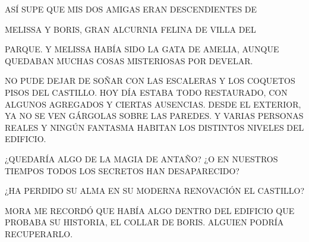 \newpage
{}
ASÍ SUPE QUE MIS DOS AMIGAS ERAN DESCENDIENTES DE 

MELISSA Y BORIS, GRAN ALCURNIA FELINA DE VILLA DEL

 PARQUE. Y MELISSA HABÍA SIDO LA GATA DE AMELIA, AUNQUE QUEDABAN MUCHAS COSAS MISTERIOSAS POR DEVELAR.
 
 NO PUDE DEJAR DE SOÑAR CON LAS ESCALERAS Y LOS COQUETOS PISOS DEL CASTILLO. HOY DÍA ESTABA TODO RESTAURADO, CON ALGUNOS AGREGADOS Y CIERTAS AUSENCIAS. DESDE EL EXTERIOR, YA NO SE VEN GÁRGOLAS SOBRE LAS PAREDES. Y VARIAS PERSONAS REALES Y NINGÚN FANTASMA HABITAN LOS DISTINTOS NIVELES DEL EDIFICIO.
 
 ¿QUEDARÍA ALGO DE LA MAGIA DE ANTAÑO? ¿O EN NUESTROS TIEMPOS TODOS LOS SECRETOS HAN DESAPARECIDO?
 
 ¿HA PERDIDO SU ALMA EN SU MODERNA RENOVACIÓN EL CASTILLO?
 
 MORA ME RECORDÓ QUE HABÍA ALGO DENTRO DEL EDIFICIO QUE PROBABA SU HISTORIA, EL COLLAR DE BORIS. ALGUIEN PODRÍA RECUPERARLO.
%  